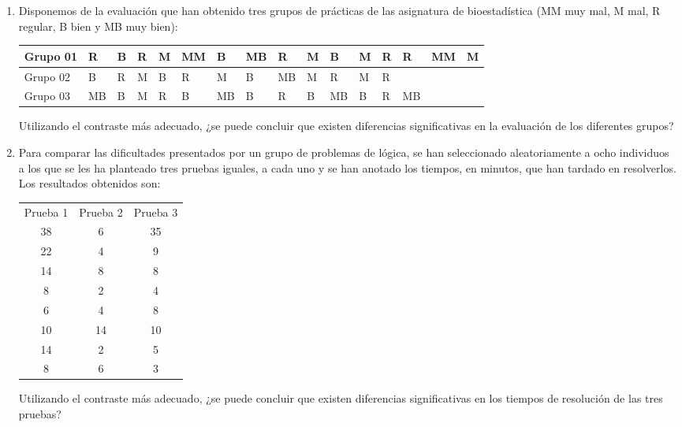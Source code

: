 {{{{{\begin{enumerate}[leftmargin=*]
\item Disponemos de la evaluación que han obtenido tres grupos de prácticas de las asignatura de bioestadística (MM muy
mal, M mal, R regular, B bien y MB muy bien):
\begin{center}
\begin{tabular}{|l|l|l|l|l|l|l|l|l|l|l|l|l|l|l|l|}
\hline
Grupo 01 & R & B & R & M & MM & B & MB & R & M & B & M & R & R & MM & M\\
\hline
Grupo 02 & B & R & M & B & R & M & B & MB & M & R & M & R & & &  \\
\hline
Grupo 03 & MB & B & M & R & B & MB & B & R & B & MB & B & R & MB & &  \\
\hline
\end{tabular}
\end{center}

Utilizando el contraste más adecuado, ¿se puede concluir que existen diferencias significativas en la evaluación de los
diferentes grupos?


\item Para comparar las dificultades presentados por un grupo de problemas de lógica, se han seleccionado aleatoriamente
a ocho individuos a los que se les ha planteado tres pruebas iguales, a cada uno y se han anotado los tiempos, en
minutos, que han tardado en resolverlos. 
Los resultados obtenidos son:
\begin{center}
\begin{tabular}{ccc}
\hline
Prueba 1 & Prueba 2 & Prueba 3 \\
38 & 6 & 35 \\
22 & 4 & 9 \\
14 & 8 & 8 \\
8 & 2 & 4 \\
6 & 4 & 8 \\
10 & 14 & 10 \\
14 & 2 & 5 \\
8 & 6 & 3 \\
\hline
\end{tabular}
\end{center}

Utilizando el contraste más adecuado, ¿se puede concluir que existen diferencias significativas en los tiempos de
resolución de las tres pruebas?



\end{enumerate}}}}}}
